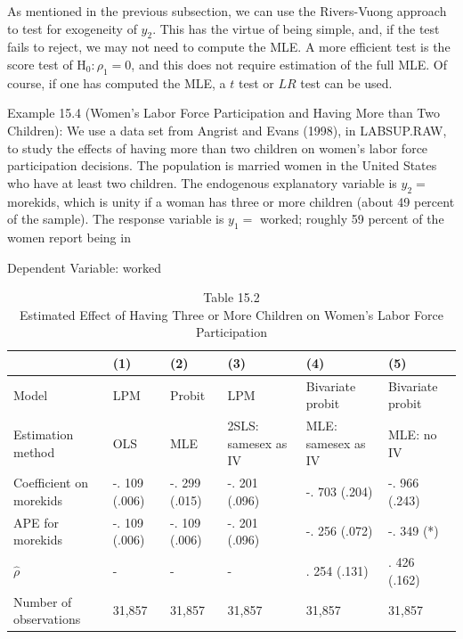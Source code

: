 \documentclass[10pt]{article}
\begin{document}
As mentioned in the previous subsection, we can use the Rivers-Vuong approach to test for exogeneity of $y_{2}$. This has the virtue of being simple, and, if the test fails to reject, we may not need to compute the MLE. A more efficient test is the score test of $\mathrm{H}_{0}: \rho_{1}=0$, and this does not require estimation of the full MLE. Of course, if one has computed the MLE, a $t$ test or $L R$ test can be used.

Example 15.4 (Women's Labor Force Participation and Having More than Two Children): We use a data set from Angrist and Evans (1998), in LABSUP.RAW, to study the effects of having more than two children on women's labor force participation decisions. The population is married women in the United States who have at least two children. The endogenous explanatory variable is $y_{2}=$ morekids, which is unity if a woman has three or more children (about 49 percent of the sample). The response variable is $y_{1}=$ worked; roughly 59 percent of the women report being in

Dependent Variable: worked

\begin{table}[h]
\begin{center}
\captionsetup{labelformat=empty}
\caption{Table 15.2\\
Estimated Effect of Having Three or More Children on Women's Labor Force Participation}
\begin{tabular}{|l|l|l|l|l|l|}
\hline
 & (1) & (2) & (3) & (4) & (5) \\
\hline
Model & LPM & Probit & LPM & Bivariate probit & Bivariate probit \\
\hline
Estimation method & OLS & MLE & 2SLS: samesex as IV & MLE: samesex as IV & MLE: no IV \\
\hline
Coefficient on morekids & -. 109 (.006) & -. 299 (.015) & -. 201 (.096) & -. 703 (.204) & -. 966 (.243) \\
\hline
APE for morekids & -. 109 (.006) & -. 109 (.006) & -. 201 (.096) & -. 256 (.072) & -. 349 (*) \\
\hline
$\hat{\rho}$ & - & - & - & . 254 (.131) & . 426 (.162) \\
\hline
Number of observations & 31,857 & 31,857 & 31,857 & 31,857 & 31,857 \\
\hline
\end{tabular}
\end{center}
\end{table}
\end{document}
